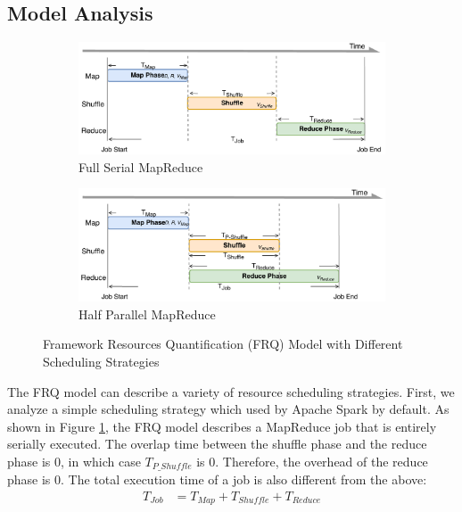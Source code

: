 {\subsection{Model Analysis}\label{model_analysis}

\begin{figure}
	\centering
	\begin{subfigure}{0.47\linewidth}
		\includegraphics[width=\linewidth]{fig/model_original}
		\caption{\color{blue}Full Serial MapReduce}
		\label{fig:model_original}
	\end{subfigure}
	\begin{subfigure}{0.47\linewidth}
		\includegraphics[width=\linewidth]{fig/model_hadoop}
		\caption{\color{blue}Half Parallel MapReduce}
		\label{fig:model_hadoop}
	\end{subfigure}
	\caption{\color{blue}Framework Resources Quantification (FRQ) Model with Different Scheduling Strategies}
	\label{fig:model_strategies}
\end{figure}

The FRQ model can describe a variety of resource scheduling strategies. First, we analyze a simple scheduling strategy which used by Apache Spark by default. 
As shown in Figure \ref{fig:model_original}, the FRQ model describes a MapReduce job that is entirely serially executed. The overlap time between the shuffle phase and the reduce phase is \(0\), in which case \(T_{P\_Shuffle}\) is \(0\). Therefore, the overhead of the reduce phase is 0. The total execution time of a job is also different from the above:
\begin{equation}
\label{equation_Tjob2}
\begin{aligned}
    T_{Job} &= T_{Map} + T_{Shuffle} + T_{Reduce}
\end{aligned}
\end{equation}

}
